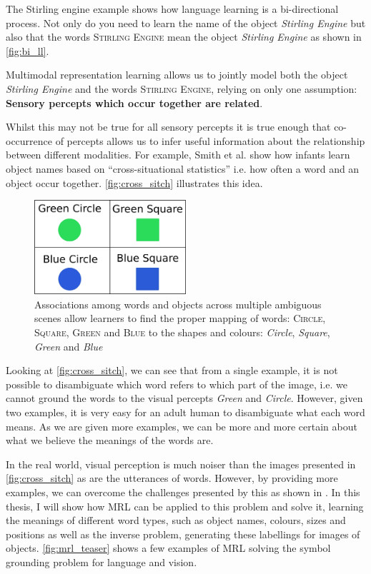 The Stirling engine example shows how language learning is a bi-directional process. Not only do you need to learn the name of the object \textit{Stirling Engine} but also that the words \textsc{Stirling Engine} mean the object \textit{Stirling Engine} as shown in \autoref{fig:bi_ll}. 

Multimodal representation learning allows us to jointly model both the object \textit{Stirling Engine} and the words \textsc{Stirling Engine}, relying on only one assumption: \textbf{Sensory percepts which occur together are related}.

Whilst this may not be true for all sensory percepts it is true enough that co-occurrence of percepts allows us to infer useful information about the relationship between different modalities. For example, Smith et al. \cite{smith2008infants} show how infants learn object names based on ``cross-situational statistics'' i.e. how often a word and an object occur together. \autoref{fig:cross_sitch} illustrates this idea.

\begin{figure}[h]
\centering
\includegraphics[width=0.5\textwidth]{Figs/introduction/shapes.png}
\caption{Associations among words and objects across multiple ambiguous scenes allow learners to find the proper mapping of words:
\textsc{Circle}, \textsc{Square}, \textsc{Green} and \textsc{Blue} to the shapes and colours: \textit{Circle},  \textit{Square},  \textit{Green} and \textit{Blue}}
\label{fig:cross_sitch}
\end{figure}

Looking at \autoref{fig:cross_sitch}, we can see that from a single example, it is not possible to disambiguate which word refers to which part of the image, i.e. we cannot ground the words  to the visual percepts \textit{Green} and \textit{Circle}. However, given two examples, it is very easy for an adult human to disambiguate what each word means. As we are given more examples, we can be more and more certain about what we believe the meanings of the words are. 

In the real world, visual perception is much noiser than the images presented in \autoref{fig:cross_sitch} as are the utterances of words. However, by providing more examples, we can overcome the challenges presented by this as shown in \cite{yurovsky2013statistical}. In this thesis, I will show how \ac{MRL} can be applied to this problem and solve it, learning the meanings of different word types, such as object names, colours, sizes and positions as well as the inverse problem, generating these labellings for images of objects. \autoref{fig:mrl_teaser} shows a few examples of \ac{MRL} solving the symbol grounding problem for language and vision.

